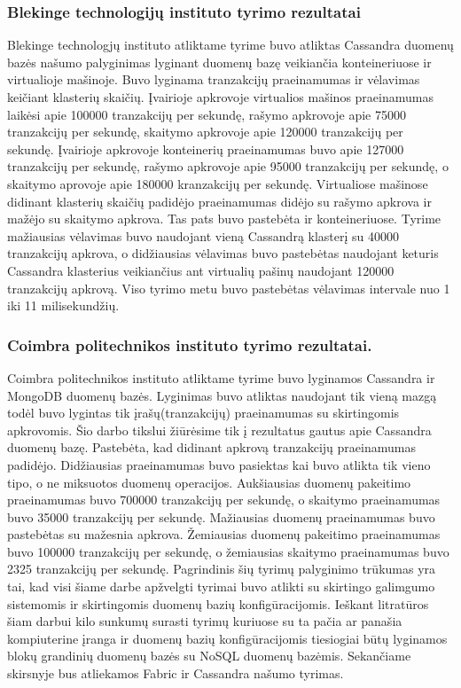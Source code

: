 \documentclass{VUMIFPSkursinis}
\begin{document}
		\subsubsection{Blekinge technologijų instituto tyrimo rezultatai}
			Blekinge technologjų instituto atliktame tyrime \cite{BITCass} buvo atliktas Cassandra duomenų bazės našumo palyginimas lyginant duomenų bazę  veikiančia konteineriuose ir virtualioje mašinoje. Buvo lyginama tranzakcijų praeinamumas ir vėlavimas keičiant klasterių skaičių. Įvairioje apkrovoje virtualios mašinos praeinamumas laikėsi apie 100000 					tranzakcijų per sekundę, rašymo apkrovoje apie 75000 tranzakcijų per sekundę, skaitymo apkrovoje apie 120000 tranzakcijų per sekundę.
			Įvairioje apkrovoje konteinerių praeinamumas buvo apie 127000 tranzakcijų per sekundę, rašymo apkrovoje apie 95000 tranzakcijų per sekundę, o skaitymo aprovoje apie 180000 kranzakcijų per sekundę. Virtualiose mašinose didinant klasterių skaičių padidėjo praeinamumas didėjo su rašymo apkrova ir mažėjo su skaitymo apkrova. Tas pats 					buvo pastebėta ir konteineriuose.
			\newline
			Tyrime mažiausias vėlavimas buvo naudojant vieną Cassandrą klasterį su 40000 tranzakcijų apkrova, o didžiausias vėlavimas buvo pastebėtas naudojant keturis Cassandra klasterius veikiančius ant virtualių pašinų naudojant 120000 tranzakcijų apkrovą. 
			Viso tyrimo metu buvo pastebėtas vėlavimas intervale nuo 1 iki 11 milisekundžių.
		\subsubsection{Coimbra politechnikos instituto tyrimo rezultatai.}
			Coimbra politechnikos instituto atliktame tyrime \cite{MonCas} buvo lyginamos Cassandra ir MongoDB duomenų bazės. 
			Lyginimas buvo atliktas naudojant tik vieną mazgą todėl buvo lygintas tik įrašų(tranzakcijų) praeinamumas su skirtingomis apkrovomis. 
			Šio darbo tikslui žiūrėsime tik į rezultatus gautus apie Cassandra duomenų bazę. Pastebėta, kad didinant apkrovą tranzakcijų praeinamumas padidėjo. 
			Didžiausias praeinamumas buvo pasiektas kai buvo atlikta tik vieno tipo, o ne miksuotos duomenų operacijos.
			Aukšiausias duomenų pakeitimo praeinamumas buvo 700000 tranzakcijų per sekundę, o skaitymo praeinamumas buvo 35000 tranzakcijų per sekundę.
			Mažiausias duomenų praeinamumas buvo pastebėtas su mažesnia apkrova.
			Žemiausias duomenų pakeitimo praeinamumas buvo 100000 tranzakcijų per sekundę, o žemiausias skaitymo praeinamumas buvo 2325 tranzakcijų per sekundę.
			\newline
			Pagrindinis šių tyrimų palyginimo trūkumas yra tai, kad visi šiame darbe apžvelgti tyrimai buvo atlikti su skirtingo galimgumo sistemomis ir skirtingomis duomenų bazių konfigūracijomis. 
			Ieškant litratūros šiam darbui kilo sunkumų surasti tyrimų kuriuose su ta pačia ar panašia kompiuterine įranga ir duomenų bazių konfigūracijomis tiesiogiai būtų lyginamos blokų 	grandinių duomenų bazės su NoSQL duomenų bazėmis. Sekančiame skirsnyje bus atliekamos Fabric ir Cassandra našumo tyrimas.
\end{document}
